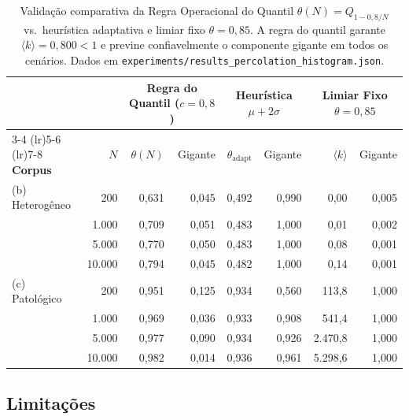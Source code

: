\documentclass[11pt,a4paper]{article}
\theoremstyle{definition}
\begin{document}
\begin{table}[h]
\centering
\small
\begin{tabular}{lrrrrrrr}
\toprule
& & \multicolumn{2}{c}{\textbf{Regra do Quantil ($c=0{,}8$)}} & \multicolumn{2}{c}{\textbf{Heur\'istica $\mu + 2\sigma$}} & \multicolumn{2}{c}{\textbf{Limiar Fixo $\theta=0{,}85$}} \\
\cmidrule(lr){3-4} \cmidrule(lr){5-6} \cmidrule(lr){7-8}
\textbf{Corpus} & $N$ & $\theta(N)$ & Gigante & $\theta_{\mathrm{adapt}}$ & Gigante & $\langle k \rangle$ & Gigante \\
\midrule
(b) Heterog\^eneo & 200 & 0,631 & 0,045 & 0,492 & 0,990 & 0,00 & 0,005 \\
& 1.000 & 0,709 & 0,051 & 0,483 & 1,000 & 0,01 & 0,002 \\
& 5.000 & 0,770 & 0,050 & 0,483 & 1,000 & 0,08 & 0,001 \\
& 10.000 & 0,794 & 0,045 & 0,482 & 1,000 & 0,14 & 0,001 \\
\midrule
(c) Patol\'ogico & 200 & 0,951 & 0,125 & 0,934 & 0,560 & 113,8 & 1,000 \\
& 1.000 & 0,969 & 0,036 & 0,933 & 0,908 & 541,4 & 1,000 \\
& 5.000 & 0,977 & 0,090 & 0,934 & 0,926 & 2.470,8 & 1,000 \\
& 10.000 & 0,982 & 0,014 & 0,936 & 0,961 & 5.298,6 & 1,000 \\
\bottomrule
\end{tabular}
\caption{Valida\c{c}\~ao comparativa da Regra Operacional do Quantil $\theta(N) = Q_{1 - 0{,}8/N}$ vs.\ heur\'istica adaptativa e limiar fixo $\theta = 0{,}85$. A regra do quantil garante $\langle k \rangle = 0{,}800 < 1$ e previne confiavelmente o componente gigante em todos os cen\'arios. Dados em \texttt{experiments/results\_percolation\_histogram.json}.}
\label{tab:quantile_validation}
\end{table}

\subsection{Limita\c{c}\~oes}
\end{document}
